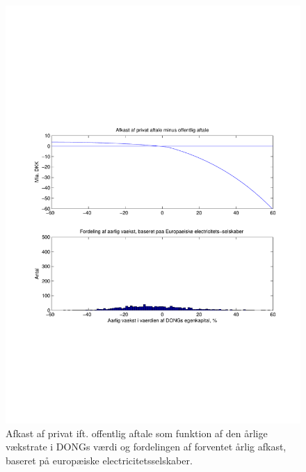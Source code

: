 \documentclass{article}
\begin{document}
\begin{figure}
\includegraphics[scale=0.8]{../matlab/figs/afkast_hist_combine_elec}
\caption{Afkast af privat ift. offentlig aftale som funktion af den årlige v\ae{}kstrate i DONGs v\ae{}rdi og fordelingen af forventet \aa{}rlig afkast, baseret p\aa{} europ\ae{}iske electricitetsselskaber.}
\label{fig:combine1}
\end{figure}
\end{document}
